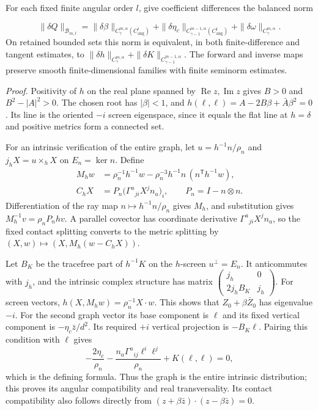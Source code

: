 \documentclass[
  english,
  11pt,
  reqno]{amsart}
\begin{document}
For each fixed finite angular order \(l\), give coefficient differences
the balanced norm

\label{eq:online-source-balanced-contact-norm} \[
\|\delta Q\|_{\mathcal B_{m,l}}
=\|\delta\beta\|_{C^{m,\alpha}_\gamma(C^l_{\mathrm{ang}})}
+\|\delta\eta_c\|_{C^{m-1,\alpha}_{\gamma-1}(C^l_{\mathrm{ang}})}
+\|\delta\omega\|_{C^{m,\alpha}_\gamma}.
\] On retained bounded sets this norm is equivalent, in both
finite-difference and tangent estimates, to
\(\|\delta h\|_{C^{m,\alpha}_\gamma}+\|\delta K\|_{C^{m-1,\alpha}_{\gamma-1}}\).
The forward and inverse maps preserve smooth finite-dimensional families
with finite seminorm estimates.

\emph{Proof.} Positivity of \(h\) on the real plane spanned by
\(\operatorname{Re}z,\operatorname{Im}z\) gives \(B>0\) and
\(B^2-|A|^2>0\). The chosen root has \(|\beta|<1\), and
\(h(\ell,\ell)=A-2B\beta+\bar A\beta^2=0\). Its line is the oriented
\(-i\) screen eigenspace, since it equals the flat line at \(h=\delta\)
and positive metrics form a connected set.

For an intrinsic verification of the entire graph, let
\(u=h^{-1}n/\rho_n\) and \(j_hX=u\times_hX\) on \(E_n=\ker n\). Define
\[
\begin{aligned}
M_hw&=\rho_n^{-1}h^{-1}w
-\rho_n^{-3}h^{-1}n\,(n^{\mathsf T}h^{-1}w),\\
C_hX&=P_n\bigl(\Gamma^a{}_{ji}X^jn_a\bigr)_i,
\qquad P_n=I-n\otimes n.
\end{aligned}
\] Differentiation of the ray map \(n\mapsto h^{-1}n/\rho_n\) gives
\(M_h\), and substitution gives \(M_h^{-1}v=\rho_nP_nhv\). A parallel
covector has coordinate derivative \(\Gamma^a{}_{ji}X^jn_a\), so the
fixed contact splitting converts to the metric splitting by
\((X,w)\mapsto(X,M_h(w-C_hX))\).

Let \(B_K\) be the tracefree part of \(h^{-1}K\) on the \(h\)-screen
\(u^\perp=E_n\). It anticommutes with \(j_h\), and the intrinsic complex
structure has matrix
\(\left(\begin{smallmatrix}j_h&0\\2j_hB_K&j_h\end{smallmatrix}\right)\).
For screen vectors, \(h(X,M_hw)=\rho_n^{-1}X\cdot w\). This shows that
\(Z_0+\beta\bar Z_0\) has eigenvalue \(-i\). For the second graph vector
its base component is \(\ell\) and its fixed vertical component is
\(-\eta_c\bar z/d^2\). Its required \(+i\) vertical projection is
\(-B_K\ell\). Pairing this condition with \(\ell\) gives \[
-\frac{2\eta_c}{\rho_n}
-\frac{n_a\Gamma^a{}_{ij}\ell^i\ell^j}{\rho_n}
+K(\ell,\ell)=0,
\] which is the defining formula. Thus the graph is the entire intrinsic
distribution; this proves its angular compatibility and real
transversality. Its contact compatibility also follows directly from
\((z+\beta\bar z)\cdot(z-\beta\bar z)=0\).
\end{document}
